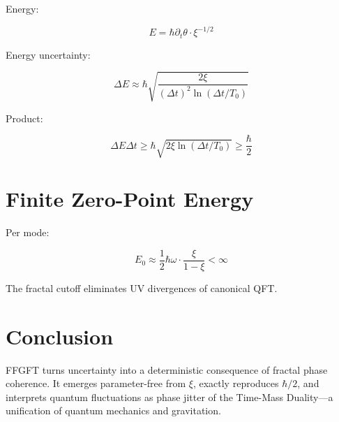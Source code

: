 	Energy:
	
	\begin{equation}
		E = \hbar \partial_t \theta \cdot \xi^{-1/2}
	\end{equation}
	
	Energy uncertainty:
	
	\begin{equation}
		\Delta E \approx \hbar \sqrt{ \frac{2 \xi}{(\Delta t)^2 \ln(\Delta t / T_0)} }
	\end{equation}
	
	Product:
	
	\begin{equation}
		\Delta E \Delta t \geq \hbar \sqrt{2 \xi \ln(\Delta t / T_0)} \geq \frac{\hbar}{2}
	\end{equation}
	
	\section*{Finite Zero-Point Energy}
	
	Per mode:
	
	\begin{equation}
		E_0 \approx \frac{1}{2} \hbar \omega \cdot \frac{\xi}{1 - \xi} < \infty
	\end{equation}
	
	The fractal cutoff eliminates UV divergences of canonical QFT.
	
	\section*{Conclusion}
	
	FFGFT turns uncertainty into a deterministic consequence of fractal phase coherence. It emerges parameter-free from $\xi$, exactly reproduces $\hbar/2$, and interprets quantum fluctuations as phase jitter of the Time-Mass Duality—a unification of quantum mechanics and gravitation.



